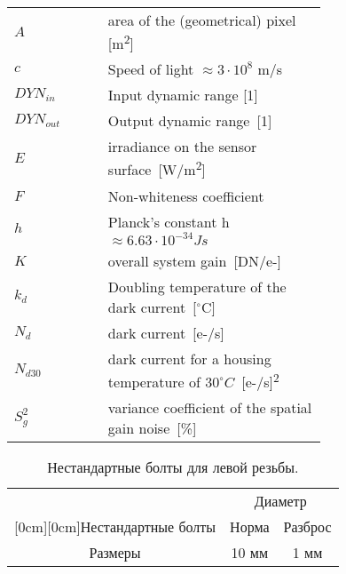 \documentclass[a4paper,12pt]{report} %
\begin{document}
    \begin{longtable}[h]{lp{0.7\linewidth}}
        $A$ & area of the (geometrical) pixel [m\textsuperscript2] \\
        $c$ & Speed of light $\approx 3 \cdot 10^8$ m/s \\
        $DYN_{in}$ & Input dynamic range [1] \\
        $DYN_{out}$ & Output dynamic range~[1] \\
        $E$ & irradiance on the sensor surface~[W/m\textsuperscript2] \\
        $F$ & Non-whiteness coefficient \\ 
        $h$ & Planck's constant h $\approx6.63 \cdot 10^{-34} Js$ \\
        $K$ & overall system gain~[DN/e-] \\
        $k_d$ & Doubling temperature of the dark current~[$^\circ$C] \\
        $N_d$ & dark current~[e-/s] \\
        $N_{d30}$ & dark current for a housing temperature of $30^\circ C$~[e-/s]\textsuperscript2 \\
        $S_g^2$ & variance coefficient of the spatial gain noise~[\%] \\
    \end{longtable}
    \begin{table}[H]
    \caption{\label{tab:bolts} Нестандартные болты для левой резьбы.}
    \begin{center}
    \begin{tabular}{|c|c|c|}
    \hline
    & \multicolumn{2}{c|}{Диаметр} \\
    \cline{2-3}
    \raisebox{1.5ex}[0cm][0cm]{Нестандартные болты}
    & Норма & Разброс \\
    \hline
    Размеры & 10 мм & 1 мм \\
    \hline
    \end{tabular}
    \end{center}
    \end{table}
\end{document}
